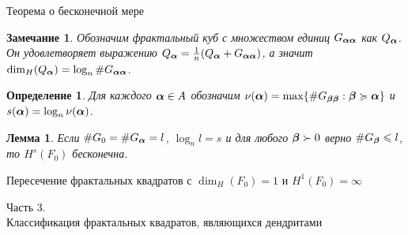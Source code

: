 \documentclass[aspectratio=1610, 10pt, notheorems]{beamer}
\newtheorem{lemma}       {Лемма}
\newtheorem{definition}  {Определение}
\newtheorem{remark}      {Замечание}
\begin{document}
\begin{frame}{Теорема о бесконечной мере}
\begin{remark}
Обозначим  фрактальный куб с множеством единиц $G_{{\bm{\alpha}}{\bm{\alpha}}}$ как $Q_{\bm{\alpha}}$.
Он удовлетворяет выражению $Q_{\bm{\alpha}}=\frac{1}{n}(Q_{\bm{\alpha}}+G_{{\bm{\alpha}}{\bm{\alpha}}})$, а значит $\dim_H(Q_{\bm{\alpha}})=\log_n\#G_{{\bm{\alpha}}{\bm{\alpha}}}$.
\end{remark} 

\begin{definition}
Для каждого ${\bm{\alpha}}\in A$ обозначим  $\nu({\bm{\alpha}})=\max\{\#G_{{\bm{\beta}}{\bm{\beta}}} : {\bm{\beta}}\succcurlyeq{\bm{\alpha}}\}$ и $s({\bm{\alpha}})=\log_n\nu({\bm{\alpha}})$.   
\end{definition}

\begin{lemma}
Если $\#G_0=\#G_{\bm{\alpha}}=l$, $\log_nl=s$ и для любого ${\bm{\beta}}\succ 0$ верно $\#G_{\bm{\beta}}\leqslant l$, то $H^s(F_0)$ бесконечна.
\end{lemma}
\end{frame}

\begin{frame}{Пересечение фрактальных квадратов с $\dim_H(F_0)=1$ и $H^1(F_0)=\infty$}
\end{frame}


\begin{frame}{}
\Huge{Часть 3.\\
Классификация фрактальных квадратов, являющихся дендритами}
\end{frame}
\end{document}
